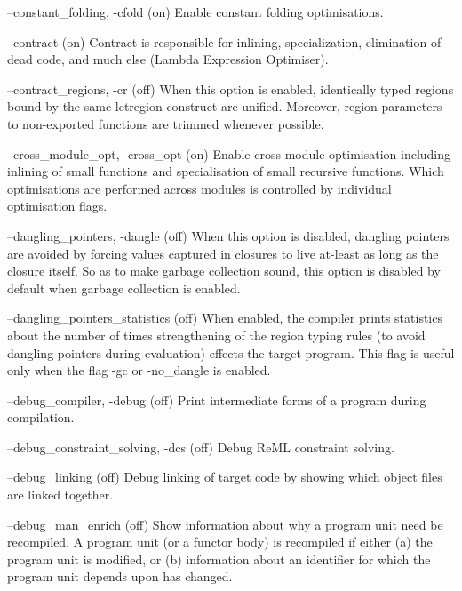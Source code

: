 \documentclass[12pt]{book}
\begin{document}
\begin{scriptcode}
--constant_folding, -cfold                                (on)
     Enable constant folding optimisations.

--contract                                                (on)
     Contract is responsible for inlining, specialization,
     elimination of dead code, and much else (Lambda
     Expression Optimiser).

--contract_regions, -cr                                  (off)
     When this option is enabled, identically typed
     regions bound by the same letregion construct
     are unified. Moreover, region parameters to
     non-exported functions are trimmed whenever
     possible.

--cross_module_opt, -cross_opt                            (on)
     Enable cross-module optimisation including inlining
     of small functions and specialisation of small
     recursive functions. Which optimisations are performed
     across modules is controlled by individual optimisation
     flags.

--dangling_pointers, -dangle                             (off)
     When this option is disabled, dangling pointers
     are avoided by forcing values captured in
     closures to live at-least as long as the closure
     itself. So as to make garbage collection sound,
     this option is disabled by default when garbage
     collection is enabled.

--dangling_pointers_statistics                           (off)
     When enabled, the compiler prints statistics about
     the number of times strengthening of the region typing
     rules (to avoid dangling pointers during evaluation)
     effects the target program. This flag is useful only
     when the flag -gc or -no_dangle is enabled.

--debug_compiler, -debug                                 (off)
     Print intermediate forms of a program during compilation.

--debug_constraint_solving, -dcs                         (off)
     Debug ReML constraint solving.

--debug_linking                                          (off)
     Debug linking of target code by showing which object
     files are linked together.

--debug_man_enrich                                       (off)
     Show information about why a program unit need be
     recompiled. A program unit (or a functor body)
     is recompiled if either (a) the program unit is
     modified, or (b) information about an identifier
     for which the program unit depends upon has changed.


\end{scriptcode}
\end{document}
